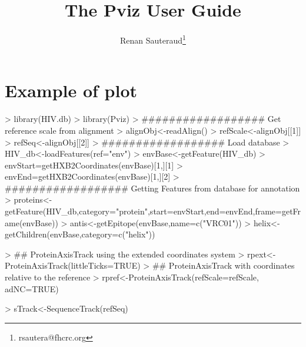 \documentclass[11pt]{article}
\author{Renan Sauteraud\footnote{rsautera@fhcrc.org}}
\begin{document}
\title{The Pviz User Guide}
\maketitle

\tableofcontents

\newpage

\section{Example of plot}
\begin{Schunk}
\begin{Sinput}
> library(HIV.db)
> library(Pviz)
> ################## Get reference scale from alignment
> alignObj<-readAlign()
> refScale<-alignObj[[1]]
> refSeq<-alignObj[[2]]
> ################## Load database
> HIV_db<-loadFeatures(ref="env")
> envBase<-getFeature(HIV_db)
> envStart=getHXB2Coordinates(envBase)[1,][1] 
> envEnd=getHXB2Coordinates(envBase)[1,][2] 
> ################## Getting Features from database for annotation
> proteins<-getFeature(HIV_db,category="protein",start=envStart,end=envEnd,frame=getFrame(envBase))
> antis<-getEpitope(envBase,name=c("VRC01"))
> helix<-getChildren(envBase,category=c("helix"))
\end{Sinput}
\end{Schunk}

\begin{Schunk}
\begin{Sinput}
> ## ProteinAxisTrack using the extended coordinates system
> rpext<-ProteinAxisTrack(littleTicks=TRUE)
> ## ProteinAxisTrack with coordinates relative to the reference
> rpref<-ProteinAxisTrack(refScale=refScale, adNC=TRUE)
\end{Sinput}
\end{Schunk}

\begin{Schunk}
\begin{Sinput}
> sTrack<-SequenceTrack(refSeq)
\end{Sinput}
\end{Schunk}

\begin{Schunk}
\end{Schunk}
\end{document}
